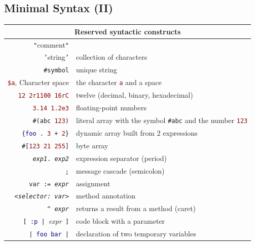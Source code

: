 \documentclass[notumble]{leaflet}
\newcommand{\code}[1]{\foreignlanguage{english}{\texttt{#1}}}
\begin{document}
\subsection{Minimal Syntax (II)}
\noindent
\begin{tabularx}{\linewidth}{@{}rX@{}}
        \toprule
        \multicolumn{2}{c}{Reserved syntactic constructs}\\
        \midrule
        \textcolor{comment}{\code{"}{comment}\code{"}}& \\
        \textcolor{string}{\code{'}{string}\code{'}}&collection of characters\\
        \textcolor{string}{\code{\#symbol}}&unique string \\
        \textcolor{darkRed}{\code{\$a}}, Character space & the character \textcolor{darkRed}{\code{a}} and a space \\
        \textcolor{darkRed}{\code{12 2r1100 16rC}} & twelve (decimal, binary, hexadecimal)\\
        \textcolor{darkRed}{\code{3.14 1.2e3}}&floating-point numbers\\
        \code{\#(\textcolor{string}{abc} \textcolor{darkRed}{123})}&literal array with the symbol \textcolor{string}{\code{\#abc}} and the number \textcolor{darkRed}{\code{123}} \\
        \code{\{\textcolor{darkBlue}{foo}\,.\ \textcolor{darkRed}{3}\,+\,\textcolor{darkRed}{2}\}}&dynamic array built from 2 expressions\\
        \code{\#[\textcolor{darkRed}{123 21 255}]} &byte array \\
        \code{\emph{exp1}. \emph{exp2}} & expression separator (period)\\
        \code{;} & message cascade (semicolon)\\
        \code{var := \emph{expr}}&assignment \\
        \code{<\emph{selector: var}>} &method annotation  \\
        \code{\textasciicircum\ \emph{expr}} &returns a result from a method (caret)\\
        \code{[\,:\textcolor{darkBlue}{p}\,|\,}\emph{expr}\code{\,]} &code block with a parameter \\
        \code{|\,\textcolor{darkBlue}{foo bar}\,|} &declaration of two temporary variables \\
        \bottomrule
\end{tabularx}

\end{document}
